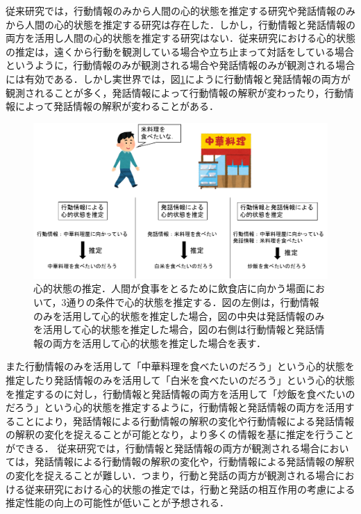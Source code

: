 \par
従来研究では，行動情報のみから人間の心的状態を推定する研究や発話情報のみから人間の心的状態を推定する研究は存在した．しかし，行動情報と発話情報の両方を活用し人間の心的状態を推定する研究はない．従来研究における心的状態の推定は，遠くから行動を観測している場合や立ち止まって対話をしている場合というように，行動情報のみが観測される場合や発話情報のみが観測される場合には有効である．しかし実世界では，図\ref{fig:fig1}にように行動情報と発話情報の両方が観測されることが多く，発話情報によって行動情報の解釈が変わったり，行動情報によって発話情報の解釈が変わることがある．
\begin{figure}[htbp]
  \begin{center}
    \includegraphics[scale=0.58]{./figure1.pdf}
    \caption{心的状態の推定．人間が食事をとるために飲食店に向かう場面において，3通りの条件で心的状態を推定する．図の左側は，行動情報のみを活用して心的状態を推定した場合，図の中央は発話情報のみを活用して心的状態を推定した場合，図の右側は行動情報と発話情報の両方を活用して心的状態を推定した場合を表す．}
    \label{fig:fig1}
  \end{center}
\end{figure}
また行動情報のみを活用して「中華料理を食べたいのだろう」という心的状態を推定したり発話情報のみを活用して「白米を食べたいのだろう」という心的状態を推定するのに対し，行動情報と発話情報の両方を活用して「炒飯を食べたいのだろう」という心的状態を推定するように，行動情報と発話情報の両方を活用することにより，発話情報による行動情報の解釈の変化や行動情報による発話情報の解釈の変化を捉えることが可能となり，より多くの情報を基に推定を行うことができる．
従来研究では，行動情報と発話情報の両方が観測される場合においては，発話情報による行動情報の解釈の変化や，行動情報による発話情報の解釈の変化を捉えることが難しい．つまり，行動と発話の両方が観測される場合における従来研究における心的状態の推定では，行動と発話の相互作用の考慮による推定性能の向上の可能性が低いことが予想される．

